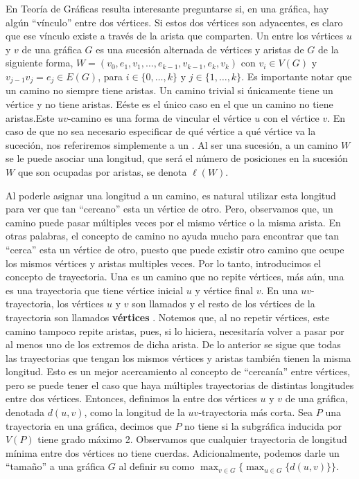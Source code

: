 En Teor\'ia de Gr\'aficas resulta interesante preguntarse si, en una gr\'afica,
hay alg\'un ``v\'inculo'' entre dos v\'ertices. Si estos dos v\'ertices son
adyacentes, es claro que ese v\'inculo existe a trav\'es de la arista que
comparten. Un  entre los v\'ertices $u$ y $v$ de una
gr\'afica $G$ es una sucesi\'on alternada de v\'ertices y aristas de $G$ de la
siguiente forma, $W=(v_0, e_1,v_1, \dots, e_{k-1},v_{k-1}, e_k,v_k)$ con $v_i
\in V(G)$ y $v_{j-1}v_j = e_j \in E(G)$, para $i \in \{0, \dots, k\}$ y $j \in
\{ 1, \dots, k\}$. Es importante notar que un camino no siempre tiene aristas.
Un camino trivial si \'unicamente tiene un v\'ertice y no tiene aristas. E\'este
es el \'unico caso en el que un camino no tiene aristas.Este $uv$-camino es una
forma de vincular el v\'ertice $u$ con el v\'ertice $v$. En caso de que no sea
necesario especificar de qu\'e v\'ertice a qu\'e v\'ertice va la suceci\'on, nos
referiremos simplemente a un . Al ser una sucesi\'on, a un camino
$W$ se le puede asociar una longitud, que ser\'a el n\'umero de posiciones en la
sucesi\'on $W$ que son ocupadas por aristas, se denota $\ell(W)$. 

Al poderle asignar una longitud a un camino, es natural utilizar esta longitud
para ver que tan ``cercano'' esta un v\'ertice de otro. Pero, observamos que, un
camino puede pasar m\'ultiples veces por el mismo v\'ertice o la misma arista.
En otras palabras, el concepto de camino no ayuda mucho para encontrar que tan
``cerca'' esta un v\'ertice de otro, puesto que puede existir otro camino que
ocupe los mismos v\'ertices y aristas multiples veces. Por lo tanto,
introducimos el concepto de trayectoria. Una  es un camino
que no repite v\'ertices, m\'as a\'un, una  es una
trayectoria que tiene v\'ertice inicial $u$ y v\'ertice final $v$. En una
$uv$-trayectoria, los v\'ertices $u$ y $v$ son llamados
 y el resto de los v\'ertices de la trayectoria
son llamados \textbf{v\'ertices} . Notemos que,
al no repetir v\'ertices, este camino tampoco repite aristas, pues, si lo
hiciera, necesitar\'ia volver a pasar por al menos uno de los extremos de dicha
arista. De lo anterior se sigue que todas las trayectorias que tengan los mismos
v\'ertices y aristas tambi\'en tienen la misma longitud. Esto es un mejor
acercamiento al concepto de ``cercan\'ia'' entre v\'ertices, pero se puede tener
el caso que haya m\'ultiples trayectorias de distintas longitudes entre dos
v\'ertices. Entonces, definimos la  entre dos v\'ertices $u$ y
$v$ de una gr\'afica, denotada $d(u,v)$, como la longitud de la $uv$-trayectoria
m\'as corta. Sea $P$ una trayectoria en una gr\'afica, decimos que $P$ no tiene
 si la subgr\'afica inducida por $V(P)$ tiene grado m\'aximo 2.
Observamos que cualquier trayectoria de longitud m\'inima entre dos v\'ertices
no tiene cuerdas. Adicionalmente, podemos darle un ``tama\~{n}o'' a una
gr\'afica $G$ al definir su  como $\max_{v\in G}\{\max_{u\in
G}\{d(u,v)\}\}$. 

